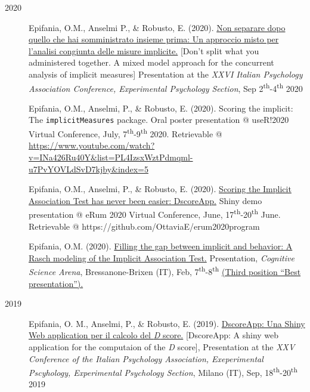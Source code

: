 \documentclass[letterpaper,12pt]{article}
\begin{document}
\begin{description}
		\item[2020] 
		

	
	\item[] 	Epifania, O.M., Anselmi P., \& Robusto, E. (2020). \href{https://ottaviae.github.io/presentations/2020/EpifaniaSimposioS4.pdf}{Non separare dopo quello che hai somministrato insieme prima: Un approccio misto per l’analisi congiunta delle misure implicite.} [Don't split what you administered together. A mixed model approach for the concurrent analysis of implicit measures] Presentation at the \emph{XXVI Italian Psychology Association Conference, Experimental Psychology Section}, Sep 2\textsuperscript{th}-4\textsuperscript{th} 2020
	
	\item[] 	Epifania, O.M., Anselmi, P., \& Robusto, E. (2020). Scoring the implicit: The \texttt{implicitMeasures} package. Oral poster presentation @ useR!2020 Virtual Conference, July, 7\textsuperscript{th}-9\textsuperscript{th}  2020.  Retrievable @ \href{https://www.youtube.com/watch?v=INa426Ru40Y&list=PL4IzsxWztPdmqml-u7PvYOVLdSvD7kjby&index=5}{https://www.youtube.com/watch?v=INa426Ru40Y\&list=PL4IzsxWztPdmqml-u7PvYOVLdSvD7kjby\&index=5}
	
	\item[] 	Epifania, O.M., Anselmi, P., \& Robusto, E. (2020). \href{https://github.com/OttaviaE/eRum2020/blob/master/eRumShinyDemo-Epifania.Rmd}{Scoring the Implicit Association Test has never been easier: DscoreApp.} Shiny demo presentation @ eRum 2020 Virtual Conference, June, 17\textsuperscript{th}-20\textsuperscript{th} June. Retrievable @ https://github.com/OttaviaE/erum2020program
	
	\item[]  Epifania, O.M. (2020). \href{https://ottaviae.github.io/presentations/2020/brixen.pdf}{Filling the gap between implicit and behavior: A Rasch modeling of the Implicit Association Test.} Presentation, \emph{Cognitive Science Arena}, Bressanone-Brixen (IT), Feb, 7\textsuperscript{th}-8\textsuperscript{th} \underline{(Third position ``Best presentation'').}
	
	\item[2019] 
	\item[] 	Epifania, O. M., Anselmi, P., \& Robusto, E. (2019). \href{https://ottaviae.github.io/presentations/2019/aip_slides.html#1}{DscoreApp: Una Shiny Web application per il calcolo del \emph{D} score.}  [DscoreApp: A shiny web application for the computaion of the \emph{D} score], Presentation at the \emph{XXV Conference of the Italian Psychology Association, Exeperimental Pscyhology, Experimental Psychology Section}, Milano (IT), Sep, 18\textsuperscript{th}-20\textsuperscript{th} 2019
	

\end{description}
\end{document}
